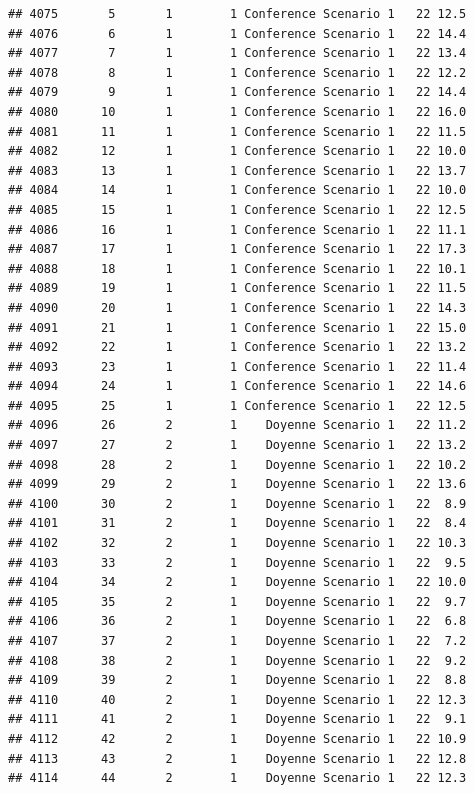 \documentclass[
]{article}
\begin{document}
\begin{verbatim}
## 4075       5       1        1 Conference Scenario 1   22 12.5
## 4076       6       1        1 Conference Scenario 1   22 14.4
## 4077       7       1        1 Conference Scenario 1   22 13.4
## 4078       8       1        1 Conference Scenario 1   22 12.2
## 4079       9       1        1 Conference Scenario 1   22 14.4
## 4080      10       1        1 Conference Scenario 1   22 16.0
## 4081      11       1        1 Conference Scenario 1   22 11.5
## 4082      12       1        1 Conference Scenario 1   22 10.0
## 4083      13       1        1 Conference Scenario 1   22 13.7
## 4084      14       1        1 Conference Scenario 1   22 10.0
## 4085      15       1        1 Conference Scenario 1   22 12.5
## 4086      16       1        1 Conference Scenario 1   22 11.1
## 4087      17       1        1 Conference Scenario 1   22 17.3
## 4088      18       1        1 Conference Scenario 1   22 10.1
## 4089      19       1        1 Conference Scenario 1   22 11.5
## 4090      20       1        1 Conference Scenario 1   22 14.3
## 4091      21       1        1 Conference Scenario 1   22 15.0
## 4092      22       1        1 Conference Scenario 1   22 13.2
## 4093      23       1        1 Conference Scenario 1   22 11.4
## 4094      24       1        1 Conference Scenario 1   22 14.6
## 4095      25       1        1 Conference Scenario 1   22 12.5
## 4096      26       2        1    Doyenne Scenario 1   22 11.2
## 4097      27       2        1    Doyenne Scenario 1   22 13.2
## 4098      28       2        1    Doyenne Scenario 1   22 10.2
## 4099      29       2        1    Doyenne Scenario 1   22 13.6
## 4100      30       2        1    Doyenne Scenario 1   22  8.9
## 4101      31       2        1    Doyenne Scenario 1   22  8.4
## 4102      32       2        1    Doyenne Scenario 1   22 10.3
## 4103      33       2        1    Doyenne Scenario 1   22  9.5
## 4104      34       2        1    Doyenne Scenario 1   22 10.0
## 4105      35       2        1    Doyenne Scenario 1   22  9.7
## 4106      36       2        1    Doyenne Scenario 1   22  6.8
## 4107      37       2        1    Doyenne Scenario 1   22  7.2
## 4108      38       2        1    Doyenne Scenario 1   22  9.2
## 4109      39       2        1    Doyenne Scenario 1   22  8.8
## 4110      40       2        1    Doyenne Scenario 1   22 12.3
## 4111      41       2        1    Doyenne Scenario 1   22  9.1
## 4112      42       2        1    Doyenne Scenario 1   22 10.9
## 4113      43       2        1    Doyenne Scenario 1   22 12.8
## 4114      44       2        1    Doyenne Scenario 1   22 12.3

\end{verbatim}
\end{document}
